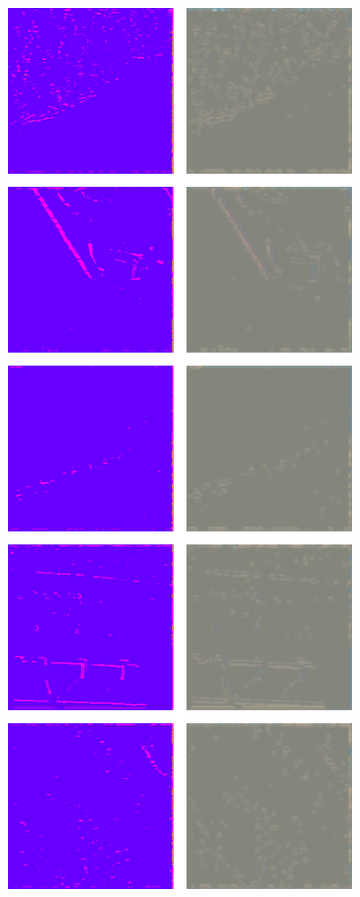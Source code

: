 \begin{figure}[h]
\begin{subfigure}{\WnetPredictionsImageWidth}
        \caption{}
        \label{fig:wnet_pred_46d-6}
    \end{subfigure} \hspace{3mm}
    \begin{subfigure}{\WnetPredictionsImageWidth}
        \includegraphics[width=\textwidth]{images/wnet/36d-20}

\end{subfigure}
\end{figure}
